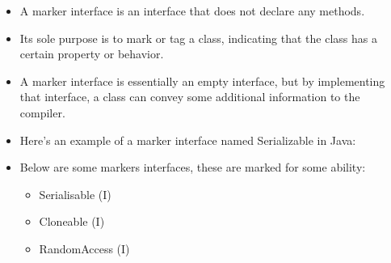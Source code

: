 \setlength{\columnsep}{3pt}
\begin{flushleft}
	
	\begin{itemize}
		\item A marker interface is an interface that does not declare any methods. 
		\item Its sole purpose is to mark or tag a class, indicating that the class has a certain property or behavior.
		
		\item A marker interface is essentially an empty interface, but by implementing that interface, a class can convey some additional information to the compiler.
		
		\item Here's an example of a marker interface named Serializable in Java:
		\bigskip
		\item Below are some markers interfaces, these are marked for some ability:
		\begin{itemize}
			\item Serialisable (I)
			\item Cloneable (I)
			\item RandomAccess (I)
		\end{itemize}
	\end{itemize}
	
	
	
\end{flushleft}

